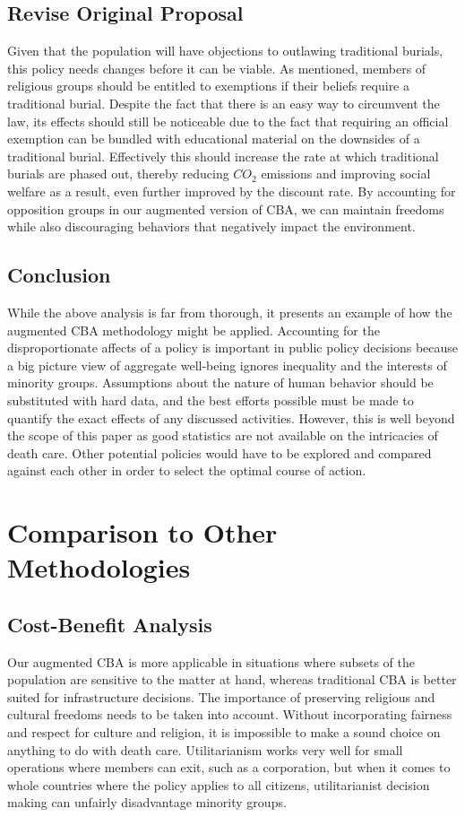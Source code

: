\documentclass[a4paper,12pt]{article}
\begin{document}
\subsection{Revise Original Proposal}
Given that the population will have objections to outlawing traditional burials, this policy needs changes before it can be viable.
As mentioned, members of religious groups should be entitled to exemptions if their beliefs require a traditional burial.
Despite the fact that there is an easy way to circumvent the law, its effects should still be noticeable due to the fact that requiring an official exemption can be bundled with educational material on the downsides of a traditional burial.
Effectively this should increase the rate at which traditional burials are phased out, thereby reducing $CO_2$ emissions and improving social welfare as a result, even further improved by the discount rate.
By accounting for opposition groups in our augmented version of CBA, we can maintain freedoms while also discouraging behaviors that negatively impact the environment.

\subsection{Conclusion}
While the above analysis is far from thorough, it presents an example of how the augmented CBA methodology might be applied.
Accounting for the disproportionate affects of a policy is important in public policy decisions because a big picture view of aggregate well-being ignores inequality and the interests of minority groups.
Assumptions about the nature of human behavior should be substituted with hard data, and the best efforts possible must be made to quantify the exact effects of any discussed activities.
However, this is well beyond the scope of this paper as good statistics are not available on the intricacies of death care.
Other potential policies would have to be explored and compared against each other in order to select the optimal course of action.

\section{Comparison to Other Methodologies}
\subsection{Cost-Benefit Analysis}
Our augmented CBA is more applicable in situations where subsets of the population are sensitive to the matter at hand, whereas traditional CBA is better suited for infrastructure decisions.
The importance of preserving religious and cultural freedoms needs to be taken into account.
Without incorporating fairness and respect for culture and religion, it is impossible to make a sound choice on anything to do with death care.
Utilitarianism works very well for small operations where members can exit, such as a corporation, but when it comes to whole countries where the policy applies to all citizens, utilitarianist decision making can unfairly disadvantage minority groups.
\end{document}
